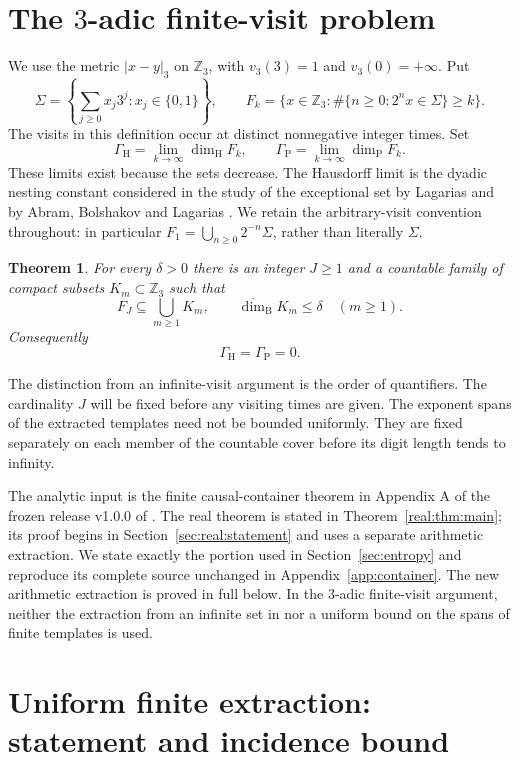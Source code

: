 \documentclass[11pt]{article}
\newtheorem{theorem}{Theorem}[section]
\theoremstyle{definition}
\theoremstyle{remark}
\newcommand{\Z}{\mathbb Z}
\newcommand{\dimH}{\dim_{\mathrm H}}
\newcommand{\dimP}{\dim_{\mathrm P}}
\newcommand{\dimB}{\overline{\dim}_{\mathrm B}}
\newcommand{\val}{v_3}
\begin{document}
\section{The $3$-adic finite-visit problem}

We use the metric $|x-y|_3$ on $\Z_3$, with $\val(3)=1$ and
$\val(0)=+\infty$. Put
\[
 \Sigma=\left\{\sum_{j\ge0}x_j3^j:x_j\in\{0,1\}\right\},
 \qquad
 F_k=\{x\in\Z_3:\#\{n\ge0:2^nx\in\Sigma\}\ge k\}.
\]
The visits in this definition occur at distinct nonnegative integer
times. Set
\[
 \Gamma_{\mathrm H}=\lim_{k\to\infty}\dimH F_k,
 \qquad
 \Gamma_{\mathrm P}=\lim_{k\to\infty}\dimP F_k.
\]
These limits exist because the sets decrease. The Hausdorff limit is
the dyadic nesting constant considered in the study of the exceptional
set by Lagarias and by Abram, Bolshakov and Lagarias
\cite{Lagarias,ABL}. We retain the arbitrary-visit convention throughout:
in particular $F_1=\bigcup_{n\ge0}2^{-n}\Sigma$, rather than literally
$\Sigma$.

\begin{theorem}\label{thm:main}
For every $\delta>0$ there is an integer $J\ge1$ and a countable family
of compact subsets $K_m\subset\Z_3$ such that
\[
 F_J\subseteq\bigcup_{m\ge1}K_m,
 \qquad \dimB K_m\le\delta\quad(m\ge1).
\]
Consequently
\[
 \boxed{\Gamma_{\mathrm H}=\Gamma_{\mathrm P}=0.}
\]
\end{theorem}

The distinction from an infinite-visit argument is the order of
quantifiers. The cardinality $J$ will be fixed before any visiting times
are given. The exponent spans of the extracted templates need not be
bounded uniformly. They are fixed separately on each member of the
countable cover before its digit length tends to infinity.

The analytic input is the finite causal-container theorem in Appendix A
of the frozen release v1.0.0 of \cite{Core}. The real theorem is stated
in Theorem~\ref{real:thm:main}; its proof begins in
Section~\ref{sec:real:statement} and uses a separate arithmetic extraction. We state exactly the portion
used in Section~\ref{sec:entropy} and reproduce its complete source
unchanged in Appendix~\ref{app:container}. The new arithmetic extraction is proved in
full below. In the $3$-adic finite-visit argument, neither the extraction
from an infinite set in \cite{Core} nor a uniform bound on the spans
of finite templates is used.

\section{Uniform finite extraction: statement and incidence bound}
\end{document}
